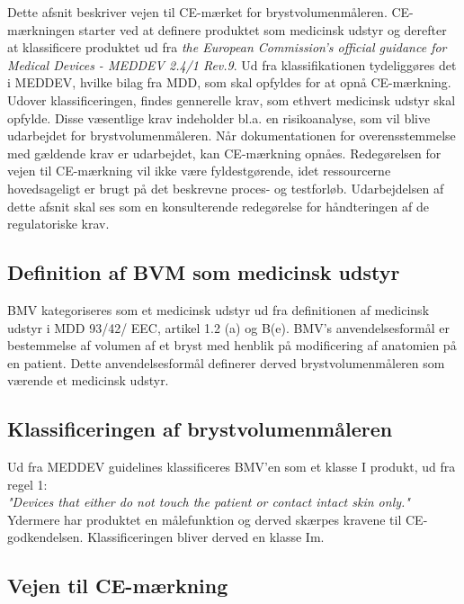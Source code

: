Dette afsnit beskriver vejen til CE-mærket for brystvolumenmåleren. CE-mærkningen starter ved at definere produktet som medicinsk udstyr og derefter at klassificere produktet ud fra \textit{the European Commission's official guidance for Medical Devices - MEDDEV 2.4/1 Rev.9}. Ud fra klassifikationen tydeliggøres det i MEDDEV, hvilke bilag fra MDD, som skal opfyldes for at opnå CE-mærkning. 
Udover klassificeringen, findes gennerelle krav, som ethvert medicinsk udstyr skal opfylde. Disse væsentlige krav indeholder bl.a. en risikoanalyse, som vil blive udarbejdet for brystvolumenmåleren. 
Når dokumentationen for overensstemmelse med gældende krav er udarbejdet, kan CE-mærkning opnåes.
Redegørelsen for vejen til CE-mærkning vil ikke være fyldestgørende, idet ressourcerne hovedsageligt er brugt på det beskrevne proces- og testforløb. Udarbejdelsen af dette afsnit skal ses som en konsulterende redegørelse for håndteringen af de regulatoriske krav. 

\subsection{Definition af BVM som medicinsk udstyr}

BMV kategoriseres som et medicinsk udstyr ud fra definitionen af medicinsk udstyr i MDD 93/42/ EEC, artikel 1.2 (a) og B(e). BMV's anvendelsesformål er bestemmelse af volumen af et bryst med henblik på modificering af anatomien på en patient. Dette anvendelsesformål definerer derved brystvolumenmåleren som værende et medicinsk udstyr. 

\subsection{Klassificeringen af brystvolumenmåleren}

Ud fra MEDDEV guidelines klassificeres BMV'en som et klasse I produkt, ud fra regel 1: \\
\textit{"Devices that either do not touch the patient or contact intact skin only."} \\
Ydermere har produktet en målefunktion og derved skærpes kravene til CE-godkendelsen. Klassificeringen bliver derved en klasse Im.

\subsection{Vejen til CE-mærkning}

